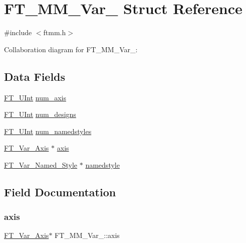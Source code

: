 \hypertarget{struct_f_t___m_m___var__}{}\section{F\+T\+\_\+\+M\+M\+\_\+\+Var\+\_\+ Struct Reference}
\label{struct_f_t___m_m___var__}


{\ttfamily \#include $<$ftmm.\+h$>$}



Collaboration diagram for F\+T\+\_\+\+M\+M\+\_\+\+Var\+\_\+\+:
\subsection*{Data Fields}
\begin{DoxyCompactItemize}
\item 
\hyperlink{fttypes_8h_abcb8db4dbf35d2b55a9e8c7b0926dc52}{F\+T\+\_\+\+U\+Int} \hyperlink{struct_f_t___m_m___var___acd32d4eb128f6fd9f6fde7da4c7b99bf}{num\+\_\+axis}
\item 
\hyperlink{fttypes_8h_abcb8db4dbf35d2b55a9e8c7b0926dc52}{F\+T\+\_\+\+U\+Int} \hyperlink{struct_f_t___m_m___var___a5109a6a20626d90ed44cd64363d29e92}{num\+\_\+designs}
\item 
\hyperlink{fttypes_8h_abcb8db4dbf35d2b55a9e8c7b0926dc52}{F\+T\+\_\+\+U\+Int} \hyperlink{struct_f_t___m_m___var___ac54bdd53447f4967b5d3b1a341a4bdff}{num\+\_\+namedstyles}
\item 
\hyperlink{ftmm_8h_a8b0e5ef119b710a0a4e09c759effe038}{F\+T\+\_\+\+Var\+\_\+\+Axis} $\ast$ \hyperlink{struct_f_t___m_m___var___a19cc7772e057dad1c4acd6e744328466}{axis}
\item 
\hyperlink{ftmm_8h_a0e14db2af2621f16b9446ce0dd7734a1}{F\+T\+\_\+\+Var\+\_\+\+Named\+\_\+\+Style} $\ast$ \hyperlink{struct_f_t___m_m___var___acda1ec5211250ddc06ec090f695adabf}{namedstyle}
\end{DoxyCompactItemize}


\subsection{Field Documentation}
\mbox{\label{struct_f_t___m_m___var___a19cc7772e057dad1c4acd6e744328466}} 
\subsubsection{\texorpdfstring{axis}{axis}}
{\footnotesize\ttfamily \hyperlink{ftmm_8h_a8b0e5ef119b710a0a4e09c759effe038}{F\+T\+\_\+\+Var\+\_\+\+Axis}$\ast$ F\+T\+\_\+\+M\+M\+\_\+\+Var\+\_\+\+::axis}

